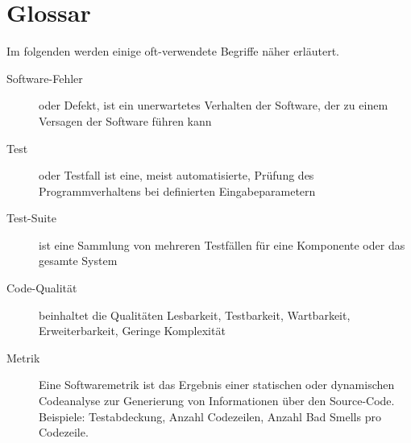  \section*{Glossar}
Im folgenden werden einige oft-verwendete Begriffe näher erläutert.
\begin{description}
 \item[Software-Fehler] oder Defekt, ist ein unerwartetes Verhalten der Software, der zu einem Versagen der Software führen kann
 \item[Test] oder Testfall ist eine, meist automatisierte, Prüfung des Programmverhaltens bei definierten Eingabeparametern
 \item[Test-Suite] ist eine Sammlung von mehreren Testfällen für eine Komponente oder das gesamte System
 \item[Code-Qualität] beinhaltet die Qualitäten Lesbarkeit, Testbarkeit, Wartbarkeit, Erweiterbarkeit, Geringe Komplexität
 \item[Metrik] Eine Softwaremetrik ist das Ergebnis einer statischen oder dynamischen Codeanalyse zur Generierung von Informationen über den Source-Code. Beispiele: Testabdeckung, Anzahl Codezeilen, Anzahl Bad Smells pro Codezeile.
 

\end{description}
